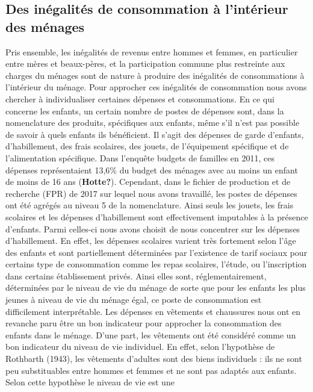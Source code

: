 \documentclass[
  12pt,
]{book}
\begin{document}
\subsection{Des inégalités de consommation à l'intérieur des
ménages}\label{des-inuxe9galituxe9s-de-consommation-uxe0-lintuxe9rieur-des-muxe9nages}

Pris ensemble, les inégalités de revenus entre hommes et femmes, en
particulier entre mères et beaux-pères, et la participation commune plus
restreinte aux charges du ménages sont de nature à produire des
inégalités de consommations à l'intérieur du ménage. Pour approcher ces
inégalités de consommation nous avons chercher à individualiser
certaines dépenses et consommations. En ce qui concerne les enfants, un
certain nombre de postes de dépenses sont, dans la nomenclature des
produits, spécifiques aux enfants, même s'il n'est pas possible de
savoir à quels enfants ils bénéficient. Il s'agit des dépenses de garde
d'enfants, d'habillement, des frais scolaires, des jouets, de
l'équipement spécifique et de l'alimentation spécifique. Dans l'enquête
budgets de familles en 2011, ces dépenses représentaient 13,6\% du
budget des ménages avec au moins un enfant de moins de 16 ans
(\textbf{Hotte?}). Cependant, dans le fichier de production et de
recherche (FPR) de 2017 sur lequel nous avons travaillé, les postes de
dépenses ont été agrégés au niveau 5 de la nomenclature. Ainsi seuls les
jouets, les frais scolaires et les dépenses d'habillement sont
effectivement imputables à la présence d'enfants. Parmi celles-ci nous
avons choisit de nous concentrer sur les dépenses d'habillement. En
effet, les dépenses scolaires varient très fortement selon l'âge des
enfants et sont partiellement déterminées par l'existence de tarif
sociaux pour certains type de consommation comme les repas scolaires,
l'étude, ou l'inscription dans certains établissement privés. Ainsi
elles sont, réglementairement, déterminées par le niveau de vie du
ménage de sorte que pour les enfants les plus jeunes à niveau de vie du
ménage égal, ce poste de consommation est difficilement interprétable.
Les dépenses en vêtements et chaussures nous ont en revanche paru être
un bon indicateur pour approcher la consommation des enfants dans le
ménage. D'une part, les vêtements ont été considéré comme un bon
indicateur du niveau de vie individuel. En effet, selon l'hypothèse de
Rothbarth (1943), les vêtements d'adultes sont des biens individuels :
ils ne sont peu substituables entre hommes et femmes et ne sont pas
adaptés aux enfants. Selon cette hypothèse le niveau de vie est une
\end{document}
